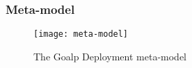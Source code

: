 \subsubsection{Meta-model}


\begin{figure}
  \centering
  \texttt{[image: meta-model]}
  \caption{The Goalp Deployment meta-model}
  \label{fig:meta-model}
\end{figure}
